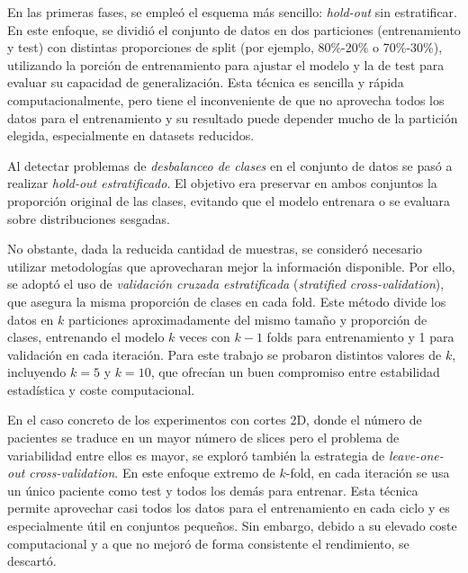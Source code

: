 En las primeras fases, se empleó el esquema más sencillo: \textit{hold-out} sin estratificar. En este enfoque, se dividió el conjunto de datos en dos particiones (entrenamiento y test) con distintas proporciones de split (por ejemplo, 80\%-20\% o 70\%-30\%), utilizando la porción de entrenamiento para ajustar el modelo y la de test para evaluar su capacidad de generalización. Esta técnica es sencilla y rápida computacionalmente, pero tiene el inconveniente de que no aprovecha todos los datos para el entrenamiento y su resultado puede depender mucho de la partición elegida, especialmente en datasets reducidos.

Al detectar problemas de \emph{desbalanceo de clases} en el conjunto de datos se pasó a realizar \textit{hold-out estratificado}. El objetivo era preservar en ambos conjuntos la proporción original de las clases, evitando que el modelo entrenara o se evaluara sobre distribuciones sesgadas.

No obstante, dada la reducida cantidad de muestras, se consideró necesario utilizar metodologías que aprovecharan mejor la información disponible. Por ello, se adoptó el uso de \textit{validación cruzada estratificada} (\emph{stratified cross-validation}), que asegura la misma proporción de clases en cada fold. Este método divide los datos en \(k\) particiones aproximadamente del mismo tamaño y proporción de clases, entrenando el modelo \(k\) veces con \(k-1\) folds para entrenamiento y 1 para validación en cada iteración. Para este trabajo se probaron distintos valores de \(k\), incluyendo \(k=5\) y \(k=10\), que ofrecían un buen compromiso entre estabilidad estadística y coste computacional.

En el caso concreto de los experimentos con cortes 2D, donde el número de pacientes se traduce en un mayor número de slices pero el problema de variabilidad entre ellos es mayor, se exploró también la estrategia de \textit{leave-one-out cross-validation}. En este enfoque extremo de \(k\)-fold, en cada iteración se usa un único paciente como test y todos los demás para entrenar. Esta técnica permite aprovechar casi todos los datos para el entrenamiento en cada ciclo y es especialmente útil en conjuntos pequeños. Sin embargo, debido a su elevado coste computacional y a que no mejoró de forma consistente el rendimiento, se descartó.


